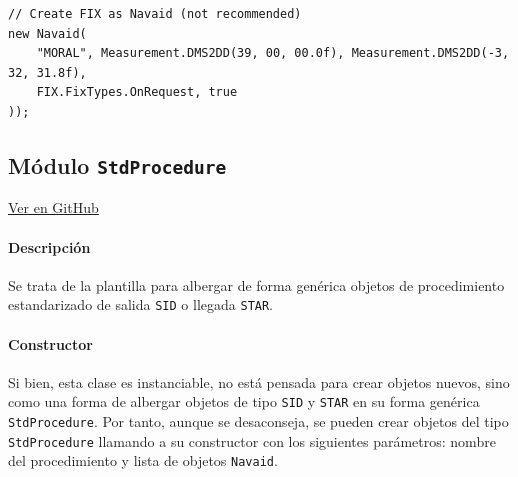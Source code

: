 \begin{table}[!hbtp]
	\caption{Ejemplo de instancia al constructor de la clase \texttt{Navaid}.}
	\label{tab:EjemploNavaid}
\end{table}
\vspace{-0.8cm}
\begin{scriptsize}
{\color{gray}
\begin{Verbatim}[frame=single]
// Create FIX as Navaid (not recommended)
new Navaid(
    "MORAL", Measurement.DMS2DD(39, 00, 00.0f), Measurement.DMS2DD(-3, 32, 31.8f),
    FIX.FixTypes.OnRequest, true
));
\end{Verbatim}
}
\end{scriptsize}







\subsection{Módulo \texttt{StdProcedure}}
\label{subsec:ClaseStdProcedure}

\vspace{-0.85cm}
\begin{flushright}
\href{https://github.com/macgyver912/atc-simulator/blob/jaime/Assets/Scripts/navaids/StdProcedure.cs}{Ver en GitHub \faGithub}
\end{flushright}

\paragraph{Descripción} \phantom{\newline}

Se trata de la plantilla para albergar de forma genérica objetos de procedimiento estandarizado de salida \texttt{SID} o llegada \texttt{STAR}.

\paragraph{Constructor} \phantom{\newline}

Si bien, esta clase es instanciable, no está pensada para crear objetos nuevos, sino como una forma de albergar objetos de tipo \texttt{SID} y \texttt{STAR} en su forma genérica \texttt{StdProcedure}. Por tanto, aunque se desaconseja, se pueden crear objetos del tipo \texttt{StdProcedure} llamando a su constructor con los siguientes parámetros: nombre del procedimiento y lista de objetos  \texttt{Navaid}.

